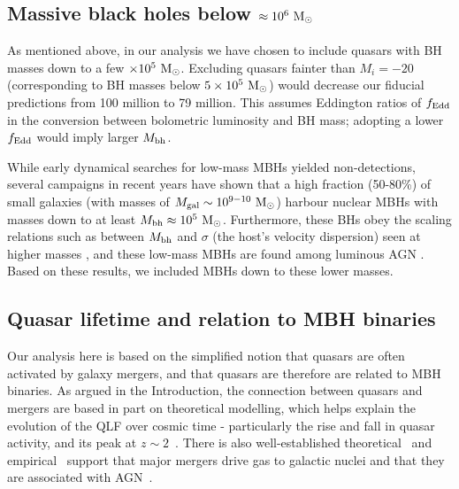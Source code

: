 \documentclass[fleqn,usenatbib]{mnras}
\begin{document}
\subsection{Massive black holes below $\approx 10^6~{\rm M_{\odot}}$} 
\label{sec:low-mass-bh}

As mentioned above, in our analysis we have chosen to include quasars with BH masses down to a few $\times 10^5~{\rm M_\odot}$. Excluding quasars fainter than $M_i=-20$ (corresponding to BH masses below $5\times 10^5~{\rm M_\odot}$) would decrease our fiducial predictions from 100 million to 79 million.  This assumes Eddington ratios of $f_{\rm Edd}$ in the conversion between bolometric luminosity and BH mass; adopting a lower $f_{\rm Edd}$ would imply larger $M_{\rm bh}$.

While early dynamical searches for low-mass MBHs yielded non-detections, several campaigns in recent years have shown that a high fraction (50-80\%) of small galaxies (with masses of $M_{\rm gal}\sim 10^{9-10}~{\rm M_\odot}$) harbour nuclear MBHs with masses down to at least $M_{\rm bh}\approx 10^5~{\rm M_\odot}$.  Furthermore, these BHs obey the scaling relations such as between  $M_{\rm bh}$ and $\sigma$ (the host's velocity dispersion) seen at higher masses \citep[see the recent review by][and references therein]{Greene+2020}, and these low-mass MBHs are found among luminous AGN \citep[e.g.][and references therein]{Kimbrell+2021}.   Based on these results, we included MBHs down to these lower masses.

\subsection{Quasar lifetime and relation to MBH binaries} 
\label{sec:quasar-lifetime}

Our analysis here is based on the simplified notion that quasars are often activated by galaxy mergers, and that quasars are therefore are related to MBH binaries.  As argued in the Introduction, the connection between quasars and mergers are based in part on theoretical modelling, which helps explain the evolution of the QLF over cosmic time - particularly the rise and fall in quasar activity, and its peak at $z\sim 2$~\citep[e.g.][]{KauffmannHaehnelt2000}.  There is also well-established theoretical~\citep[e.g.][]{BarnesHernquist1991} and empirical~\citep[e.g.][]{Genzel+2010} support that major mergers drive gas to galactic nuclei and that they are associated with AGN~\citep[e.g.][]{Goulding+2018}.
\end{document}
